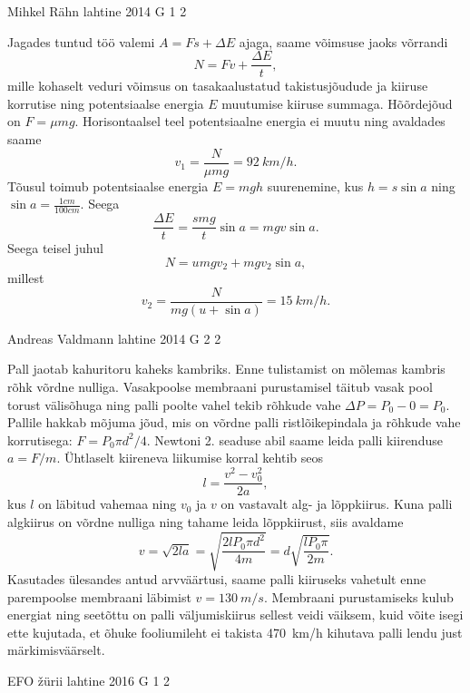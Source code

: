 \documentclass[11pt]{article}
\begin{document}
{%
{Mihkel Rähn} %
{lahtine} %
{2014} %
{G 1} %
{2} %
{

\ifSolution
Jagades tuntud töö valemi $A=Fs+\Delta E$ ajaga, saame võimsuse jaoks võrrandi 
\[
N=Fv+\frac{\Delta E}{t},
\]
mille kohaselt veduri võimsus on tasakaalustatud takistusjõudude ja kiiruse korrutise ning potentsiaalse energia $E$ muutumise kiiruse summaga. Hõõrdejõud on $F=\mu mg$. Horisontaalsel teel potentsiaalne energia ei muutu ning avaldades saame
\[
v_1=\frac{N}{\mu mg}=\SI{92}{km \per h}.
\]
Tõusul toimub potentsiaalse energia $E=mgh$ suurenemine, kus $h=s\sin a$ ning $\sin a=\frac{1cm}{100cm}$. Seega
\[
\frac{\Delta E}{t}=\frac{smg}{t}\sin a=mgv\sin a.
\]
Seega teisel juhul
\[
N=umgv_2+mgv_2\sin a,
\]
millest
\[
v_2=\frac{N}{mg(u+\sin a)}=\SI{15}{km \per h}.
\]
\fi
}

{Andreas Valdmann} %
{lahtine} %
{2014} %
{G 2} %
{2} %
{

\ifSolution
Pall jaotab kahuritoru kaheks kambriks. Enne tulistamist on mõlemas kambris rõhk võrdne nulliga. Vasakpoolse membraani purustamisel täitub vasak pool torust välisõhuga ning palli poolte vahel tekib rõhkude vahe $\Delta P=P_0-0=P_0$. Pallile hakkab mõjuma jõud, mis on võrdne palli ristlõikepindala ja rõhkude vahe korrutisega: $F=P_0\pi d^2/4$. Newtoni 2. seaduse abil saame leida palli kiirenduse $a=F/m$. Ühtlaselt kiireneva liikumise korral kehtib seos
\[ l=\frac{v^2-v_0^2}{2a}, \]
kus $l$ on läbitud vahemaa ning $v_0$ ja $v$ on vastavalt alg- ja lõppkiirus. Kuna palli algkiirus on võrdne nulliga ning tahame leida lõppkiirust, siis avaldame
\[ v=\sqrt{2la}=\sqrt{\frac{2lP_0\pi d^2}{4m}}=d\sqrt{\frac{lP_0\pi}{2m}}.\]
Kasutades ülesandes antud arvväärtusi, saame palli kiiruseks vahetult enne parempoolse membraani läbimist $v=\SI{130}{m/s}$. Membraani purustamiseks kulub energiat ning seetõttu on palli väljumiskiirus sellest veidi väiksem, kuid võite isegi ette kujutada, et õhuke fooliumileht ei takista \SI{470}{km/h} kihutava palli lendu just märkimisväärselt.
\fi
}

{EFO žürii} %
{lahtine} %
{2016} %
{G 1} %
{2} %
{

}}
\end{document}
